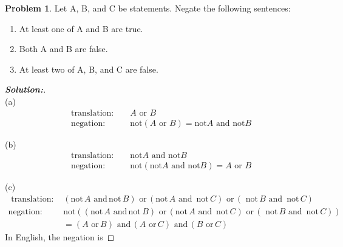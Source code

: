 \documentclass[12pt]{article}
\theoremstyle{definition}\newtheorem{problem}{Problem}
\newenvironment{solution}{\begin{proof}[\bfseries\textup{Solution:}]}{\end{proof}}
\begin{document}
\newpage
\begin{problem}
Let A, B, and C be statements.  Negate the following sentences:
\begin{enumerate}
\item At least one of A and B are true.
\item Both A and B are false.
\item At least two of A, B, and C are false.
\end{enumerate}
\end{problem}
\begin{solution}  \, \\
    
    
    (a) \begin{align}
        &\text{translation: } &&A \text{ or } B \\
        &\text{negation: } &&\text{not} (A \text{ or } B) = \text{not} A \text{ and } \text{not} B
    \end{align}

    (b) \begin{align}
        &\text{translation: } &&\text{not} A \text{ and } \text{not} B \\
        &\text{negation: } &&\text{not} (\text{not} A \text{ and } \text{not} B) = A \text{ or } B
    \end{align}

    (c) \begin{align}
        \text{  translation: } &(\text{not}\,A \text{ and}\,\text{not}\,B) \text{ or}\, (\text{not}\,A \text{ and}\, \text{ not}\,C) \text{ or}\,(\text{ not}\,B \text{ and}\,\text{ not}\,C)\\
        \text{negation: } &\text{not}((\text{not}\,A \text{ and}\,\text{not}\,B) \text{ or}\, (\text{not}\,A \text{ and}\, \text{ not}\,C) \text{ or}\,(\text{ not}\,B \text{ and}\,\text{ not}\,C))\\
        & = ( A \text{ or}\, B) \text{ and}\, (A  \text{ or}\, C) \text{ and}\, (B \text{ or}\, C)
    \end{align}
In English, the negation is 
\end{solution}
\end{document}
